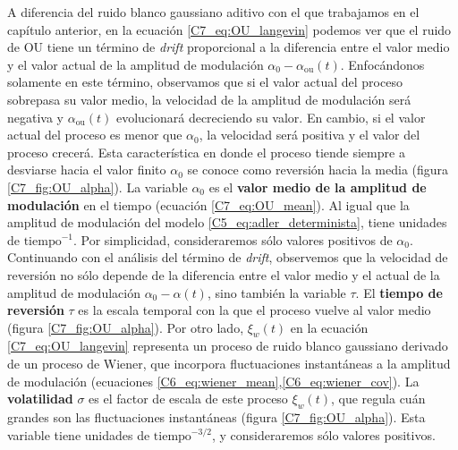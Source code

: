 \documentclass[./main.tex]{subfiles}
\begin{document}
A diferencia del ruido blanco gaussiano aditivo con el que trabajamos en el capítulo anterior, en la ecuación \ref{C7_eq:OU_langevin} podemos ver que el ruido de OU tiene un término de \textit{drift} proporcional a la diferencia entre el valor medio y el valor actual de la amplitud de modulación $\alpha_0 - \alpha_{\text{ou}}(t)$. Enfocándonos solamente en este término, observamos que si el valor actual del proceso sobrepasa su valor medio, la velocidad de la amplitud de modulación será negativa y $\alpha_{\text{ou}}(t)$ evolucionará decreciendo su valor. En cambio, si el valor actual del proceso es menor que $\alpha_0$, la velocidad será positiva y el valor del proceso crecerá. Esta característica en donde el proceso tiende siempre a desviarse hacia el valor finito $\alpha_0$ se conoce como reversión hacia la media (figura \ref{C7_fig:OU_alpha}).  La variable $\alpha_0$ es el \textbf{valor medio de la amplitud de modulación} en el tiempo (ecuación \ref{C7_eq:OU_mean}). Al igual que la amplitud de modulación del modelo \ref{C5_eq:adler_determinista}, tiene unidades de $\text{tiempo}^{-1}$. Por simplicidad, consideraremos sólo valores positivos de $\alpha_0$. Continuando con el análisis del término de \textit{drift}, observemos que la velocidad de reversión no sólo depende de la diferencia entre el valor medio y el actual de la amplitud de modulación $\alpha_0 - \alpha(t)$, sino también la variable $\tau$. El \textbf{tiempo de reversión} $\tau$ es la escala temporal con la que el proceso vuelve al valor medio (figura \ref{C7_fig:OU_alpha}). Por otro lado, $\xi_w(t)$ en la ecuación \ref{C7_eq:OU_langevin} representa un proceso de ruido blanco gaussiano derivado de un proceso de Wiener, que incorpora fluctuaciones instantáneas a la amplitud de modulación (ecuaciones \ref{C6_eq:wiener_mean},\ref{C6_eq:wiener_cov}). La \textbf{volatilidad} $\sigma$ es el factor de escala de este proceso $\xi_w(t)$, que regula cuán grandes son las fluctuaciones instantáneas  (figura \ref{C7_fig:OU_alpha}). Esta variable tiene unidades de $\text{tiempo}^{-3/2}$, y consideraremos sólo valores positivos. 
\end{document}
